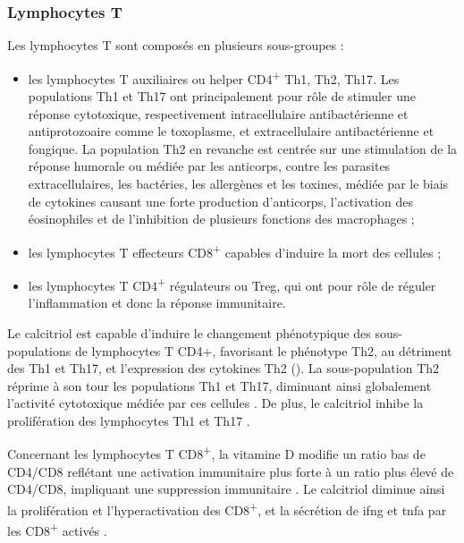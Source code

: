 \documentclass[
  a4paper,
  DIV=11,
  numbers=noendperiod,
  listof=totoc]{scrreprt}
\begin{document}
\subsubsection{Lymphocytes T}\label{lymphocytes-t}

Les lymphocytes T sont composés en plusieurs sous-groupes :

\begin{itemize}
\item
  les lymphocytes T auxiliaires ou helper CD4\textsuperscript{+}
  \ac{Th1}, \ac{Th2}, \ac{Th17}. Les populations \ac{Th1} et \ac{Th17}
  ont principalement pour rôle de stimuler une réponse cytotoxique,
  respectivement intracellulaire antibactérienne et antiprotozoaire
  comme le toxoplasme, et extracellulaire antibactérienne et fongique.
  La population \ac{Th2} en revanche est centrée sur une stimulation de
  la réponse humorale ou médiée par les anticorps, contre les parasites
  extracellulaires, les bactéries, les allergènes et les toxines, médiée
  par le biais de cytokines causant une forte production d'anticorps,
  l'activation des éosinophiles et de l'inhibition de plusieurs
  fonctions des macrophages \autocite{Cantorna.2015,Walker.2018} ;
\item
  les lymphocytes T effecteurs CD8\textsuperscript{+} capables d'induire
  la mort des cellules ;
\item
  les lymphocytes T CD4\textsuperscript{+} régulateurs ou \ac{Treg}, qui
  ont pour rôle de réguler l'inflammation et donc la réponse
  immunitaire.
\end{itemize}

Le calcitriol est capable d'induire le changement phénotypique des
sous-populations de lymphocytes T CD4+, favorisant le phénotype Th2, au
détriment des \ac{Th1} et \ac{Th17}, et l'expression des cytokines
\ac{Th2} (). La sous-population \ac{Th2} réprime à
son tour les populations \ac{Th1} et \ac{Th17}, diminuant ainsi
globalement l'activité cytotoxique médiée par ces cellules
\autocite{Meza-Meza.2022}. De plus, le calcitriol inhibe la
prolifération des lymphocytes \ac{Th1} et \ac{Th17}
\autocite{Cantorna.2015}.

Concernant les lymphocytes T CD8\textsuperscript{+}, la vitamine D
modifie un ratio bas de CD4/CD8 reflétant une activation immunitaire
plus forte à un ratio plus élevé de CD4/CD8, impliquant une suppression
immunitaire \autocite{Charoenngam.2020}. Le calcitriol diminue ainsi la
prolifération et l'hyperactivation des CD8\textsuperscript{+}, et la
sécrétion de \ac{ifng} et \ac{tnfa} par les CD8\textsuperscript{+}
activés \autocite{Dankers.2017}.
\end{document}

